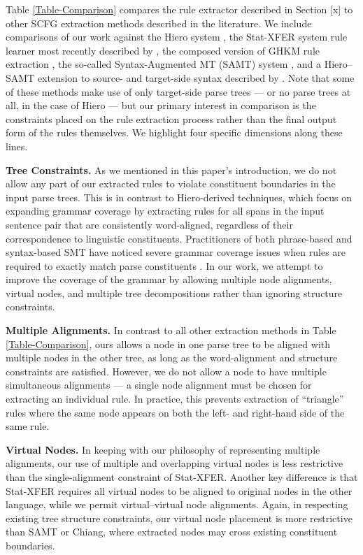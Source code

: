 \documentclass[11pt]{article}
\begin{document}
Table \ref{Table-Comparison} compares the rule extractor described in Section [x] to other SCFG extraction methods described in the literature.  We include comparisons of our work against the Hiero system \cite{Chiang-Hiero}, the Stat-XFER system rule learner most recently described by , the composed version of GHKM rule extraction \cite{GalleyEtAl-TTS}, the so-called Syntax-Augmented MT (SAMT) system \cite{ZollmannVenugopal-SyntaxAugmentedMT}, and a Hiero--SAMT extension to source- and target-side syntax described by .  Note that some of these methods make use of only target-side parse trees --- or no parse trees at all, in the case of Hiero --- but our primary interest in comparison is the constraints placed on the rule extraction process rather than the final output form of the rules themselves.  We highlight four specific dimensions along these lines.

{\bf Tree Constraints.}  As we mentioned in this paper's introduction, we do not allow any part of our extracted rules to violate constituent boundaries in the input parse trees.  This is in contrast to Hiero-derived techniques, which focus on expanding grammar coverage by extracting rules for all spans in the input sentence pair that are consistently word-aligned, regardless of their correspondence to linguistic constituents.  Practitioners of both phrase-based and syntax-based SMT have noticed severe grammar coverage issues when rules are required to exactly match parse constituents \cite{KoehnEtAl-PBSMT,Chiang-SourceAndTarget}.   In our work, we attempt to improve the coverage of the grammar by allowing multiple node alignments, virtual nodes, and multiple tree decompositions rather than ignoring structure constraints.

{\bf Multiple Alignments.}  In contrast to all other extraction methods in Table \ref{Table-Comparison}, ours allows a node in one parse tree to be aligned with multiple nodes in the other tree, as long as the word-alignment and structure constraints are satisfied.  However, we do not allow a node to have multiple simultaneous alignments --- a single node alignment must be chosen for extracting an individual rule.  In practice, this prevents extraction of ``triangle'' rules where the same node appears on both the left- and right-hand side of the same rule.

{\bf Virtual Nodes.}  In keeping with our philosophy of representing multiple alignments, our use of multiple and overlapping virtual nodes is less restrictive than the single-alignment constraint of Stat-XFER.  Another key difference is that Stat-XFER requires all virtual nodes to be aligned to original nodes in the other language, while we permit virtual--virtual node alignments.  Again, in respecting existing tree structure constraints, our virtual node placement is more restrictive than SAMT or Chiang, where extracted nodes may cross existing constituent boundaries.
\end{document}
